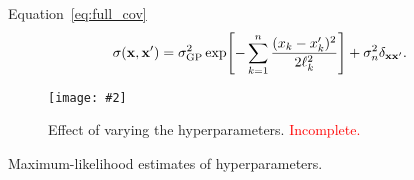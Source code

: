 \documentclass[aps,prc,reprint,superscriptaddress,amsmath]{revtex4-1}
\newcommand{\todo}[1]{\textcolor{red}{#1}}
\newcommand{\colfig}[3][t]{
  \begin{figure}[#1]
    \texttt{[image: \#2]}
    \caption{\label{fig:#2}#3}
  \end{figure}
}
\begin{document}
Equation~\eqref{eq:full_cov}
\begin{equation*}
  \sigma(\mathbf x, \mathbf x') = \sigma_\text{GP}^2 \exp\Biggl[ -\sum_{k=1}^n \frac{(x_k - x'_k)^2}{2\ell_k^2} \Biggr] + \sigma_n^2\delta_{\mathbf x\mathbf x'}.
\end{equation*}

\colfig{training}{
  Effect of varying the hyperparameters.
    \todo{Incomplete.}
}

\begin{table}
  \caption{
    \label{tab:hyperpars}
    Maximum-likelihood estimates of hyperparameters.
  }
  
\end{table}




\end{document}
